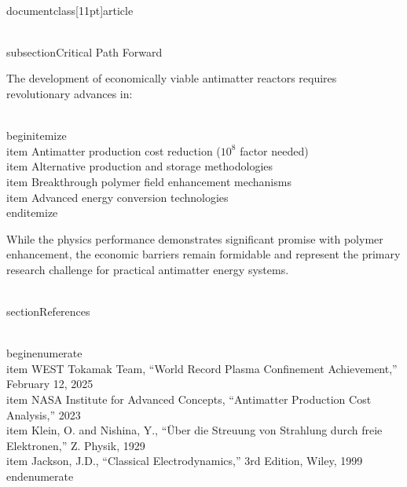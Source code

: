 \\documentclass[11pt]{article}
\begin{document}
\\subsection{Critical Path Forward}

The development of economically viable antimatter reactors requires revolutionary advances in:

\\begin{itemize}
    \\item Antimatter production cost reduction ($10^8$ factor needed)
    \\item Alternative production and storage methodologies
    \\item Breakthrough polymer field enhancement mechanisms
    \\item Advanced energy conversion technologies
\\end{itemize}

While the physics performance demonstrates significant promise with polymer enhancement, the economic barriers remain formidable and represent the primary research challenge for practical antimatter energy systems.

\\section{References}

\\begin{enumerate}
    \\item WEST Tokamak Team, ``World Record Plasma Confinement Achievement,'' February 12, 2025
    \\item NASA Institute for Advanced Concepts, ``Antimatter Production Cost Analysis,'' 2023
    \\item Klein, O. and Nishina, Y., ``Über die Streuung von Strahlung durch freie Elektronen,'' Z. Physik, 1929
    \\item Jackson, J.D., ``Classical Electrodynamics,'' 3rd Edition, Wiley, 1999
\\end{enumerate}

\
\end{document}
